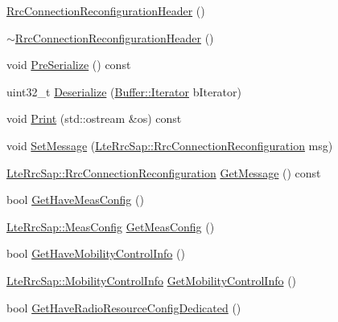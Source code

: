 \begin{DoxyCompactItemize}
\item 
\hyperlink{classns3_1_1RrcConnectionReconfigurationHeader_a761ae8391d0970080e796369f554640d}{Rrc\+Connection\+Reconfiguration\+Header} ()
\item 
\hyperlink{classns3_1_1RrcConnectionReconfigurationHeader_a82b3614b93004f377128b7e574c7c71b}{$\sim$\+Rrc\+Connection\+Reconfiguration\+Header} ()
\item 
void \hyperlink{classns3_1_1RrcConnectionReconfigurationHeader_a31fcc446b60bcc1ecc0de47c5ee47ffd}{Pre\+Serialize} () const 
\item 
uint32\+\_\+t \hyperlink{classns3_1_1RrcConnectionReconfigurationHeader_a3de5336b7cbf44d26b57dd17183361be}{Deserialize} (\hyperlink{classns3_1_1Buffer_1_1Iterator}{Buffer\+::\+Iterator} b\+Iterator)
\item 
void \hyperlink{classns3_1_1RrcConnectionReconfigurationHeader_aaa10021656df6502f75a5fd546eeb7f7}{Print} (std\+::ostream \&os) const 
\item 
void \hyperlink{classns3_1_1RrcConnectionReconfigurationHeader_abc9a78a740fda3538e0386a96cdbfcbe}{Set\+Message} (\hyperlink{structns3_1_1LteRrcSap_1_1RrcConnectionReconfiguration}{Lte\+Rrc\+Sap\+::\+Rrc\+Connection\+Reconfiguration} msg)
\item 
\hyperlink{structns3_1_1LteRrcSap_1_1RrcConnectionReconfiguration}{Lte\+Rrc\+Sap\+::\+Rrc\+Connection\+Reconfiguration} \hyperlink{classns3_1_1RrcConnectionReconfigurationHeader_ae06ca42ab50390237e53ed6b4ea587b3}{Get\+Message} () const 
\item 
bool \hyperlink{classns3_1_1RrcConnectionReconfigurationHeader_aa2c54bda9f2bead051cd35aaa77515cd}{Get\+Have\+Meas\+Config} ()
\item 
\hyperlink{structns3_1_1LteRrcSap_1_1MeasConfig}{Lte\+Rrc\+Sap\+::\+Meas\+Config} \hyperlink{classns3_1_1RrcConnectionReconfigurationHeader_af3950b0c19a5f473287d04037b123e86}{Get\+Meas\+Config} ()
\item 
bool \hyperlink{classns3_1_1RrcConnectionReconfigurationHeader_a38dae0ae9965330e40e0d112b08f07b4}{Get\+Have\+Mobility\+Control\+Info} ()
\item 
\hyperlink{structns3_1_1LteRrcSap_1_1MobilityControlInfo}{Lte\+Rrc\+Sap\+::\+Mobility\+Control\+Info} \hyperlink{classns3_1_1RrcConnectionReconfigurationHeader_afb774014bb0ccce71cce685b7f868b51}{Get\+Mobility\+Control\+Info} ()
\item 
bool \hyperlink{classns3_1_1RrcConnectionReconfigurationHeader_ab54941f5d1ee434044bdf8fad8d1ee08}{Get\+Have\+Radio\+Resource\+Config\+Dedicated} ()

\end{DoxyCompactItemize}
